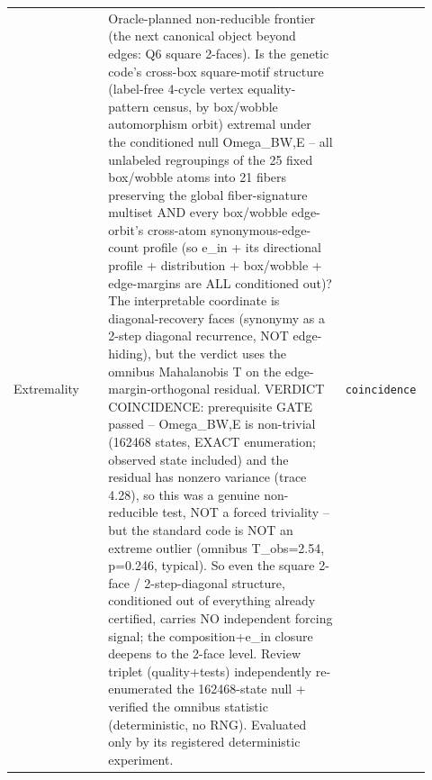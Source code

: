 \begin{longtable}{>{\raggedright\arraybackslash}p{0.22\linewidth}>{\raggedright\arraybackslash}p{0.55\linewidth}>{\raggedright\arraybackslash}p{0.15\linewidth}}
Extremality & Oracle-planned non-reducible frontier (the next canonical object beyond edges: Q6 square 2-faces). Is the genetic code's cross-box square-motif structure (label-free 4-cycle vertex equality-pattern census, by box/wobble automorphism orbit) extremal under the conditioned null Omega\_BW,E -- all unlabeled regroupings of the 25 fixed box/wobble atoms into 21 fibers preserving the global fiber-signature multiset AND every box/wobble edge-orbit's cross-atom synonymous-edge-count profile (so e\_in + its directional profile + distribution + box/wobble + edge-margins are ALL conditioned out)? The interpretable coordinate is diagonal-recovery faces (synonymy as a 2-step diagonal recurrence, NOT edge-hiding), but the verdict uses the omnibus Mahalanobis T on the edge-margin-orthogonal residual. VERDICT COINCIDENCE: prerequisite GATE passed -- Omega\_BW,E is non-trivial (162468 states, EXACT enumeration; observed state included) and the residual has nonzero variance (trace 4.28), so this was a genuine non-reducible test, NOT a forced triviality -- but the standard code is NOT an extreme outlier (omnibus T\_obs=2.54, p=0.246, typical). So even the square 2-face / 2-step-diagonal structure, conditioned out of everything already certified, carries NO independent forcing signal; the composition+e\_in closure deepens to the 2-face level. Review triplet (quality+tests) independently re-enumerated the 162468-state null + verified the omnibus statistic (deterministic, no RNG). Evaluated only by its registered deterministic experiment. & \texttt{coincidence} \\

\end{longtable}

